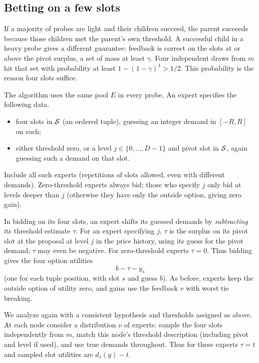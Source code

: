 \subsection{Betting on a few slots}

If a majority of probes are light and their children succeed, the
parent succeeds because those children met the parent's own threshold.
A successful child in a heavy probe gives a different guarantee:
feedback is correct on the slots at or above the pivot surplus, a set
of mass at least \(\gamma\). Four independent draws from \(m\) hit
that set with probability at least \(1-(1-\gamma)^4>1/2\).
This probability is the reason four slots suffice.

The algorithm uses the same pool \(E\) in every probe. An expert
specifies the following data.

\begin{itemize}
 \item four slots in \(\mathcal S\) (an ordered tuple),
 guessing an integer demand in \([-R,R]\) on each;
 \item either threshold zero, or a level \(j\in\{0,\ldots,D-1\}\)
 and pivot slot in \(\mathcal S\), again guessing such a demand on that slot.
\end{itemize}
Include all such experts (repetitions of slots allowed, even with
different demands).
Zero-threshold experts always bid; those who specify \(j\)
only bid at levels deeper than \(j\)
(otherwise they have only the outside option, giving zero gain).

In bidding on its four slots, an expert shifts
its guessed demands by \emph{subtracting} its threshold estimate \(\tau\).
For an expert specifying \(j\),
\(\tau\) is the surplus
on its pivot slot at the proposal at level \(j\) in the price history,
using its guess for the pivot demand; \(\tau\) may even be negative.
For zero-threshold experts \(\tau=0\).
Thus bidding gives the four option utilities
\[
                b-\tau-y_s
\]
(one for each tuple position, with slot \(s\) and guess \(b\)).
As before, experts keep the outside option of utility zero,
and gains use the feedback \(v\) with worst tie breaking.

We analyze again with a consistent hypothesis and thresholds
assigned as above.
At each node consider a distribution \(\nu\)
of experts: sample the four slots independently from \(m\),
match this node's threshold description (including pivot
and level if used), and use true demands throughout.
Thus for these experts \(\tau=t\)
and sampled slot utilities are \(d_s(y)-t\).

